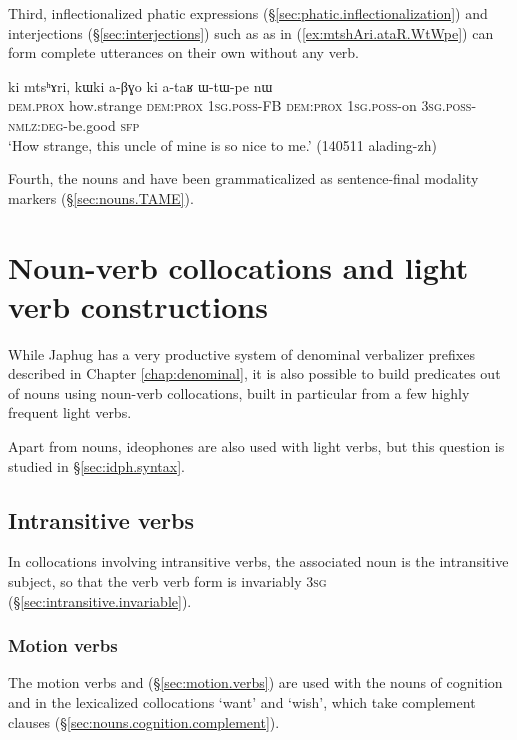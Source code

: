 Third, inflectionalized phatic expressions (§\ref{sec:phatic.inflectionalization}) and interjections  (§\ref{sec:interjections}) such as  as in (\ref{ex:mtshAri.ataR.WtWpe}) can form complete utterances on their own without any verb.

\begin{exe}
\ex \label{ex:mtshAri.ataR.WtWpe}
\gll ki mtsʰɤri, kɯki a-βɣo ki a-taʁ ɯ-tɯ-pe nɯ \\
\textsc{dem}.\textsc{prox}  how.strange \textsc{dem}:\textsc{prox} \textsc{1sg}.\textsc{poss}-FB \textsc{dem}:\textsc{prox} \textsc{1sg}.\textsc{poss}-on \textsc{3sg}.\textsc{poss}-\textsc{nmlz}:\textsc{deg}-be.good \textsc{sfp} \\
\glt `How strange, this uncle of mine is so nice to me.' (140511 alading-zh)
\end{exe}

Fourth, the nouns  and  have been grammaticalized as sentence-final modality markers (§\ref{sec:nouns.TAME}).
  
  
 
\section{Noun-verb collocations and light verb constructions} \label{sec:light.verb}
 
While Japhug has a very productive system of denominal verbalizer prefixes described in Chapter \ref{chap:denominal}, it is also possible to build predicates out of nouns using noun-verb collocations, built in particular from a few highly frequent light verbs. 

Apart from nouns, ideophones are also used with light verbs, but this question is studied in §\ref{sec:idph.syntax}.
 
\subsection{Intransitive verbs} \label{sec:intr.light.verbs}
In collocations involving intransitive verbs, the associated noun is the intransitive subject, so that the verb verb form is invariably \textsc{3sg} (§\ref{sec:intransitive.invariable}).

\subsubsection{Motion verbs} \label{sec:motion.light.verbs}
The motion verbs  and   (§\ref{sec:motion.verbs}) are used with the  nouns of cognition  and  in the lexicalized collocations  `want' and   `wish', which take complement clauses (§\ref{sec:nouns.cognition.complement}). 

